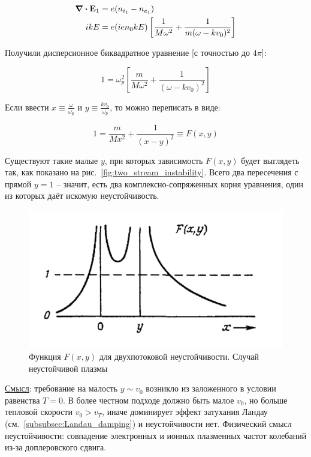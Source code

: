 \documentclass[10pt, a4paper]{article}
\begin{document}
\begin{itemize}
\begin{itemize}
		\begin{align*}
			\div{\vb{E}_1} &= e(n_{i_1}-n_{e_1}) \\
			ik E &= e(ien_0kE) \left[ \frac{1}{M\omega^2} + \frac{1}{m(\omega - kv_0)^2}\right] 
		\end{align*}
		
		Получили дисперсионное биквадратное уравнение [с точностью до $4\pi$]:
		
		\begin{equation*}
			1 = \omega_p^2\left[\frac{m}{M\omega^2} + \frac{1}{(\omega - kv_0)^2}\right] 
		\end{equation*}
	
		Если ввести $x\equiv\frac{\omega}{\omega_p}$ и $y\equiv\frac{kv_0}{\omega_p}$, то можно переписать в виде:
		
		\begin{equation*}
			1 = \frac{m}{Mx^2}+\frac{1}{(x-y)^2} \equiv F(x, y)
		\end{equation*}
		 
		Существуют такие малые $y$, при которых зависимость $F(x,y)$ будет выглядеть так, как показано на рис.~\eqref{fig:two_stream_instability}. Всего два пересечения с прямой $y=1$ -- значит, есть два комплексно-сопряженных корня уравнения, один из которых даёт искомую неустойчивость.
		
		\begin{figure}[ht]
			\begin{center}
				\includegraphics[width=0.5\linewidth]{two_stream_instability}
			\end{center}
			\caption{Функция $F(x,y)$ для двухпотоковой неустойчивости. Случай неустойчивой плазмы~\cite{chen}}
			\label{fig:two_stream_instability} 
		\end{figure}
		
		\uline{Смысл}: требование на малость $y\sim v_0$ возникло из заложенного в условии равенства $T=0$. В более честном подходе должно быть малое $v_0$, но больше тепловой скорости $v_0>v_T$, иначе доминирует эффект затухания Ландау (см.~\ref{subsubsec:Landau_damping}) и неустойчивости нет. Физический смысл неустойчивости: совпадение электронных и ионных плазменных частот колебаний из-за доплеровского сдвига.
		

\end{itemize}
\end{itemize}
\end{document}
